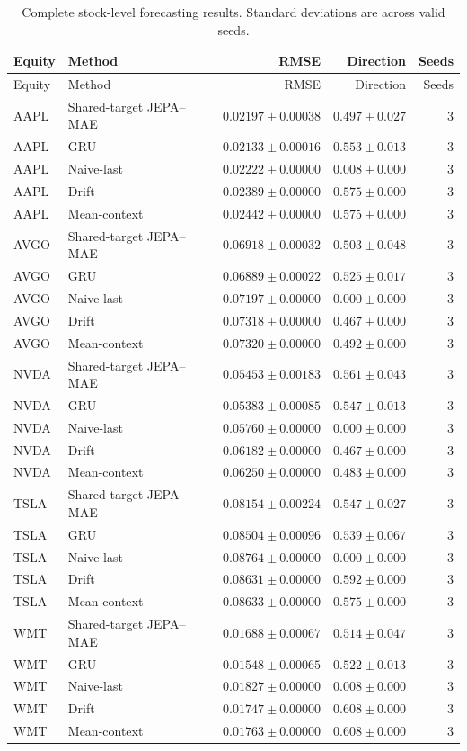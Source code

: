\begin{longtable}{llrrr}
\caption{Complete stock-level forecasting results. Standard deviations are across valid seeds.}\label{tab:appendix_stock_metrics}\\
\toprule
Equity & Method & RMSE & Direction & Seeds \\
\midrule
\endfirsthead
\toprule
Equity & Method & RMSE & Direction & Seeds \\
\midrule
\endhead
AAPL & Shared-target JEPA--MAE & $0.02197 \pm 0.00038$ & $0.497 \pm 0.027$ & 3 \\
AAPL & GRU & $0.02133 \pm 0.00016$ & $0.553 \pm 0.013$ & 3 \\
AAPL & Naive-last & $0.02222 \pm 0.00000$ & $0.008 \pm 0.000$ & 3 \\
AAPL & Drift & $0.02389 \pm 0.00000$ & $0.575 \pm 0.000$ & 3 \\
AAPL & Mean-context & $0.02442 \pm 0.00000$ & $0.575 \pm 0.000$ & 3 \\
AVGO & Shared-target JEPA--MAE & $0.06918 \pm 0.00032$ & $0.503 \pm 0.048$ & 3 \\
AVGO & GRU & $0.06889 \pm 0.00022$ & $0.525 \pm 0.017$ & 3 \\
AVGO & Naive-last & $0.07197 \pm 0.00000$ & $0.000 \pm 0.000$ & 3 \\
AVGO & Drift & $0.07318 \pm 0.00000$ & $0.467 \pm 0.000$ & 3 \\
AVGO & Mean-context & $0.07320 \pm 0.00000$ & $0.492 \pm 0.000$ & 3 \\
NVDA & Shared-target JEPA--MAE & $0.05453 \pm 0.00183$ & $0.561 \pm 0.043$ & 3 \\
NVDA & GRU & $0.05383 \pm 0.00085$ & $0.547 \pm 0.013$ & 3 \\
NVDA & Naive-last & $0.05760 \pm 0.00000$ & $0.000 \pm 0.000$ & 3 \\
NVDA & Drift & $0.06182 \pm 0.00000$ & $0.467 \pm 0.000$ & 3 \\
NVDA & Mean-context & $0.06250 \pm 0.00000$ & $0.483 \pm 0.000$ & 3 \\
TSLA & Shared-target JEPA--MAE & $0.08154 \pm 0.00224$ & $0.547 \pm 0.027$ & 3 \\
TSLA & GRU & $0.08504 \pm 0.00096$ & $0.539 \pm 0.067$ & 3 \\
TSLA & Naive-last & $0.08764 \pm 0.00000$ & $0.000 \pm 0.000$ & 3 \\
TSLA & Drift & $0.08631 \pm 0.00000$ & $0.592 \pm 0.000$ & 3 \\
TSLA & Mean-context & $0.08633 \pm 0.00000$ & $0.575 \pm 0.000$ & 3 \\
WMT & Shared-target JEPA--MAE & $0.01688 \pm 0.00067$ & $0.514 \pm 0.047$ & 3 \\
WMT & GRU & $0.01548 \pm 0.00065$ & $0.522 \pm 0.013$ & 3 \\
WMT & Naive-last & $0.01827 \pm 0.00000$ & $0.008 \pm 0.000$ & 3 \\
WMT & Drift & $0.01747 \pm 0.00000$ & $0.608 \pm 0.000$ & 3 \\
WMT & Mean-context & $0.01763 \pm 0.00000$ & $0.608 \pm 0.000$ & 3 \\
\bottomrule
\end{longtable}
